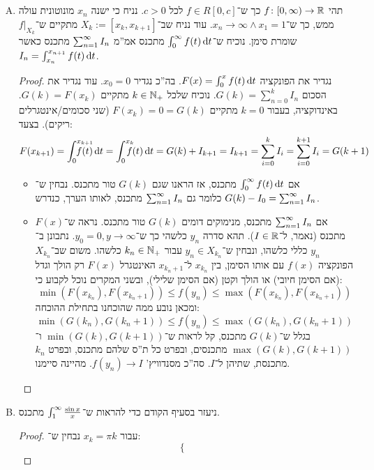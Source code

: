 \documentclass[]{../../../../tex/classes/homework}
\begin{document}
	\section{}
	\begin{enumerate}[(A)]
		\item תהי $f \colon [0, \infty) \to \mathbb{R}$ כך ש־$f \in R[0, c]$ לכל $c > 0$. נניח כי ישנה $x_n$ מונוטונית עולה ממש, כך ש־$x_n \to \infty \land x_1 = 1$. עוד נניח שב־$X_k:=[x_k, x_{k + 1}]$ מתקיים ש־$f|_{X_k}$ שומרת סימן. נוכיח ש־$\int^{\infty}_0 f(t)\,\mathrm{d}t$ מתכנס אמ''מ $\sum_{n = 1}^{\infty} I_n$ מתכנס כאשר $I_n = \int^{x_{n + 1}}_{x_n}f(t)\,\mathrm{d}t$. 
		\begin{proof}
			נגדיר את הפונקציה $F(x) = \int^{x}_0 f(t)\,\mathrm{d}t$. בה''כ נגדיר $x_0 =0$. עוד נגדיר את הסכום $G(k) = \sum_{n = 0}^{k} I_n$. נוכיח שלכל $k\in \mathbb{N}_+$ מתקיים $G(k) = F(x_k)$. באינדוקציה, בעבור $k = 0$ מתקיים $F(x_k) = 0 = G(k)$ (שני סכומים/אינטגרלים ריקים). בצעד: 
			\[ F(x_{k + 1}) = \int^{x_{k + 1}}_{0}\dequad \dequad f(t)\dt = \int_{0}^{x_k}\dequad f(t)\dt = G(k) + I_{k + 1} = I_{k + 1} = \sum_{i = 0}^{k}I_i = \sum_{i = 0}^{k + 1}I_i = G({k + 1}) \]
			\begin{itemize}
				\item אם $\int^{\infty}_0 f(t)\,\mathrm{d}t$ מתכנס, אז הראנו שגם $G(k)$ טור מתכנס. נבחין ש־$G(k) - I_0 = \sum_{n = 1}^{\infty} I_n$ כלומר גם $\sum_{n = 1}^{\infty} I_n$ מתכנס, לאותו הערך, כנדרש. 
				\item אם $\sum_{n = 1}^{\infty} I_n$ מתכנס, מנימוקים דומים $G(k)$ טור מתכנס. נראה ש־$F(x)$ מתכנס (נאמר, ל־$I \in \mathbb{R}$). תהא סדרה $y_n$ כלשהי כך ש־$y_0 = 0, y \to \infty$. נתבונן ב־$y_n$ כללי כלשהו, ונבחין ש־$y_n \in X_{k_n}$ עבור $k_n \in \mathbb{N}_+$ כלשהו. משום שב־$X_{{k_n}}$ הפונקציה $f(x)$ עם אותו הסימן, בין $x_{k_n}$ ל־$x_{{k_n} + 1}$ האינטגרל $F(x)$ רק הולך וגדל (אם הסימן חיובי) או הולך וקטן (אם הסימן שלילי), ובשני המקרים נוכל לקבוע כי: 
				\[ \min(F(x_{k_n}), F(x_{k_n + 1})) \le f(y_n) \le \max(F(x_{k_n}), F(x_{k_n + 1})) \]
				ומכאן נובע ממה שהוכחנו בתחילת ההוכחה: 
				\[ \min(G({k_n}), G({k_n + 1})) \le f(y_n) \le \max(G({k_n}), G({k_n + 1})) \]
				בגלל ש־$G(k)$ מתכנס, קל לראות ש־$\min(G(k), G(k + 1))$ ו־$\max(G(k), G(k + 1))$ מתכנסים, ובפרט כל ת''ס שלהם מתכנס, ובפרט $k_n$ מתכנסת, שתיהן ל־$I$. סה''כ מסנדוויץ' $f(y_n) \to I$. מהיינה סיימנו. 
			\end{itemize}
		\end{proof}
		\item ניעזר בסעיף הקודם כדי להראות ש־$\int^{\infty}_1\frac{\sin x}{x}$ מתכנס. \begin{proof}
			עבור $x_k = \pi k$ נבחין ש־: 
			\[ \begin{cases}

\end{cases}\]
\end{proof}
\end{enumerate}
\end{document}
